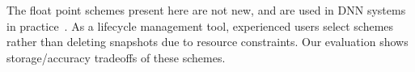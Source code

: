 \documentclass[conference]{IEEEtran}
\begin{document}
The float point schemes present here are not new, and are used in DNN systems in practice~\cite{vanhoucke2011improving,han2015deep,courbariaux2014training}. As a lifecycle management tool, \weightstore{} experienced users select schemes rather than deleting snapshots due to resource constraints. Our evaluation shows storage/accuracy tradeoffs of these schemes.

\end{document}

